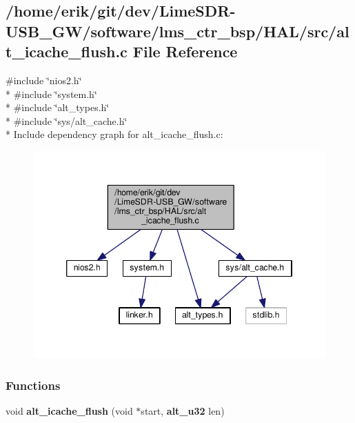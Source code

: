 \subsection{/home/erik/git/dev/\+Lime\+S\+D\+R-\/\+U\+S\+B\+\_\+\+G\+W/software/lms\+\_\+ctr\+\_\+bsp/\+H\+A\+L/src/alt\+\_\+icache\+\_\+flush.c File Reference}
\label{alt__icache__flush_8c}
{\ttfamily \#include \char`\"{}nios2.\+h\char`\"{}}\\*
{\ttfamily \#include \char`\"{}system.\+h\char`\"{}}\\*
{\ttfamily \#include \char`\"{}alt\+\_\+types.\+h\char`\"{}}\\*
{\ttfamily \#include \char`\"{}sys/alt\+\_\+cache.\+h\char`\"{}}\\*
Include dependency graph for alt\+\_\+icache\+\_\+flush.\+c\+:
\nopagebreak
\begin{figure}[H]
\begin{center}
\leavevmode
\includegraphics[width=346pt]{da/d62/alt__icache__flush_8c__incl}
\end{center}
\end{figure}
\subsubsection*{Functions}
\begin{DoxyCompactItemize}
\item 
void {\bf alt\+\_\+icache\+\_\+flush} (void $\ast$start, {\bf alt\+\_\+u32} len)
\end{DoxyCompactItemize}


